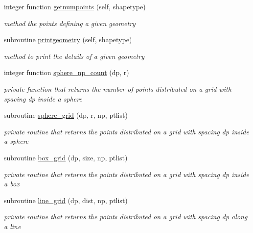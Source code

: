 \begin{DoxyCompactItemize}
integer function \mbox{\hyperlink{namespacegeometry__mod_a524c5d28a80fb6729b102126485605ce}{getnumpoints}} (self, shapetype)
\begin{DoxyCompactList}\small\item\em method the points defining a given geometry \end{DoxyCompactList}\item 
subroutine \mbox{\hyperlink{namespacegeometry__mod_aed4426181ca851b41717edd50268e5f3}{printgeometry}} (self, shapetype)
\begin{DoxyCompactList}\small\item\em method to print the details of a given geometry \end{DoxyCompactList}\item 
integer function \mbox{\hyperlink{namespacegeometry__mod_a05de7940b4e7df5a2b31f3d0414e3743}{sphere\+\_\+np\+\_\+count}} (dp, r)
\begin{DoxyCompactList}\small\item\em private function that returns the number of points distributed on a grid with spacing dp inside a sphere \end{DoxyCompactList}\item 
subroutine \mbox{\hyperlink{namespacegeometry__mod_a6c03a4ea3de6763940396dbeb3908ebc}{sphere\+\_\+grid}} (dp, r, np, ptlist)
\begin{DoxyCompactList}\small\item\em private routine that returns the points distributed on a grid with spacing dp inside a sphere \end{DoxyCompactList}\item 
subroutine \mbox{\hyperlink{namespacegeometry__mod_ae87e4ecff2d21a839da2b82919b5fd0b}{box\+\_\+grid}} (dp, size, np, ptlist)
\begin{DoxyCompactList}\small\item\em private routine that returns the points distributed on a grid with spacing dp inside a box ~\newline
 \end{DoxyCompactList}\item 
subroutine \mbox{\hyperlink{namespacegeometry__mod_abcb09c0f5274c27cb79b0dd009ed94b3}{line\+\_\+grid}} (dp, dist, np, ptlist)
\begin{DoxyCompactList}\small\item\em private routine that returns the points distributed on a grid with spacing dp along a line ~\newline
 \end{DoxyCompactList}\end{DoxyCompactItemize}
